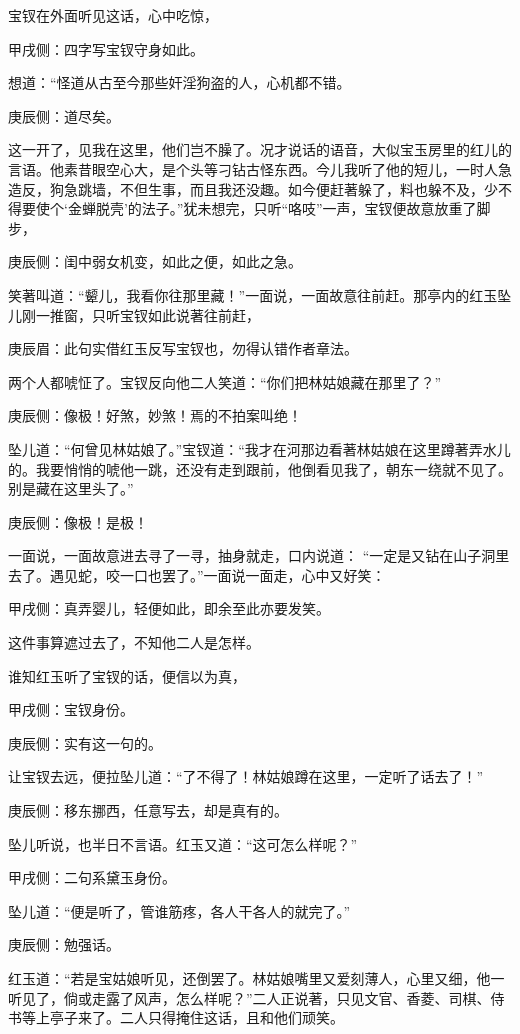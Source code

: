 \begin{parag}
    宝钗在外面听见这话，心中吃惊，\begin{note}甲戌侧：四字写宝钗守身如此。\end{note}想道：“怪道从古至今那些奸淫狗盗的人，心机都不错。\begin{note}庚辰侧：道尽矣。\end{note}这一开了，见我在这里，他们岂不臊了。况才说话的语音，大似宝玉房里的红儿的言语。他素昔眼空心大，是个头等刁钻古怪东西。今儿我听了他的短儿，一时人急造反，狗急跳墙，不但生事，而且我还没趣。如今便赶著躲了，料也躲不及，少不得要使个‘金蝉脱壳’的法子。”犹未想完，只听“咯吱”一声，宝钗便故意放重了脚步，\begin{note}庚辰侧：闺中弱女机变，如此之便，如此之急。\end{note}笑著叫道：“颦儿，我看你往那里藏！”一面说，一面故意往前赶。那亭内的红玉坠儿刚一推窗，只听宝钗如此说著往前赶，\begin{note}庚辰眉：此句实借红玉反写宝钗也，勿得认错作者章法。\end{note}两个人都唬怔了。宝钗反向他二人笑道：“你们把林姑娘藏在那里了？”\begin{note}庚辰侧：像极！好煞，妙煞！焉的不拍案叫绝！\end{note}坠儿道：“何曾见林姑娘了。”宝钗道：“我才在河那边看著林姑娘在这里蹲著弄水儿的。我要悄悄的唬他一跳，还没有走到跟前，他倒看见我了，朝东一绕就不见了。别是藏在这里头了。”\begin{note}庚辰侧：像极！是极！\end{note}一面说，一面故意进去寻了一寻，抽身就走，口内说道： “一定是又钻在山子洞里去了。遇见蛇，咬一口也罢了。”一面说一面走，心中又好笑：\begin{note}甲戌侧：真弄婴儿，轻便如此，即余至此亦要发笑。\end{note}这件事算遮过去了，不知他二人是怎样。
\end{parag}


\begin{parag}
    谁知红玉听了宝钗的话，便信以为真，\begin{note}甲戌侧：宝钗身份。\end{note}\begin{note}庚辰侧：实有这一句的。\end{note}让宝钗去远，便拉坠儿道：“了不得了！林姑娘蹲在这里，一定听了话去了！”\begin{note}庚辰侧：移东挪西，任意写去，却是真有的。\end{note}坠儿听说，也半日不言语。红玉又道：“这可怎么样呢？”\begin{note}甲戌侧：二句系黛玉身份。\end{note}坠儿道：“便是听了，管谁筋疼，各人干各人的就完了。”\begin{note}庚辰侧：勉强话。\end{note}红玉道：“若是宝姑娘听见，还倒罢了。林姑娘嘴里又爱刻薄人，心里又细，他一听见了，倘或走露了风声，怎么样呢？”二人正说著，只见文官、香菱、司棋、侍书等上亭子来了。二人只得掩住这话，且和他们顽笑。
\end{parag}


